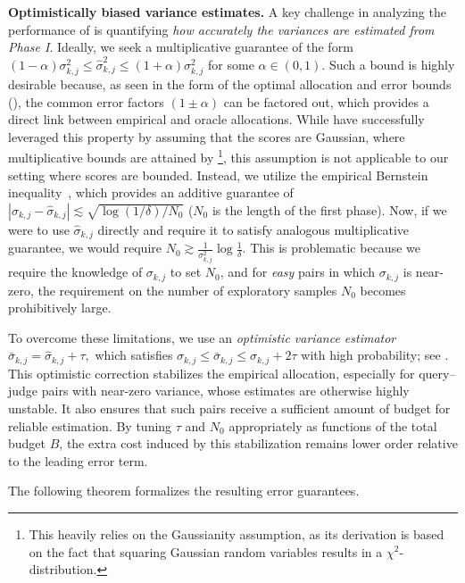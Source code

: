 \documentclass{article}
\theoremstyle{plain}
\theoremstyle{definition}
\theoremstyle{plain}
\begin{document}
{\bf Optimistically biased variance estimates.} A key challenge in analyzing the performance of  is quantifying \emph{how accurately the variances are estimated from Phase I}.
Ideally, we seek a multiplicative guarantee of the form $(1 - \alpha) \sigma_{k,j}^2 \leq \hat{\sigma}_{k,j}^2 \leq (1 + \alpha) \sigma_{k,j}^2$ for some $\alpha \in (0,1)$.
Such a bound is highly desirable because, as seen in the form of the optimal allocation and error bounds (), the common error factors $(1 \pm \alpha)$ can be factored out, which provides a direct link between empirical and oracle allocations. While \citep[Lemma 6]{saha2026budget} have successfully leveraged this property by assuming that the scores are Gaussian, where multiplicative bounds are attained by \citep[Eqn. (4.4) \& (4.5)]{laurent-massart}\footnote{This heavily relies on the Gaussianity assumption, as its derivation is based on the fact that squaring Gaussian random variables results in a $\chi^2$-distribution.}, this assumption is not applicable to our setting where scores are bounded.
Instead, we utilize the empirical Bernstein inequality~\citep[Theorem 10]{maurer-pontil}, which provides an additive guarantee of $| \sigma_{k,j} - \hat{\sigma}_{k,j}| \lesssim \sqrt{\log(1/\delta)/N_0}$ ($N_0$ is the length of the first phase).
Now, if we were to use $\hat{\sigma}_{k,j}$ directly and require it to satisfy analogous multiplicative guarantee, we would require $N_0 \gtrsim \frac{1}{\sigma_{k,j}^2} \log\frac{1}{\delta}$.
This is problematic because we require the knowledge of $\sigma_{k,j}$ to set $N_0$, and for \emph{easy} pairs in which $\sigma_{k,j}$ is near-zero, the requirement on the number of exploratory samples $N_0$ becomes prohibitively large.

To overcome these limitations, we use an \emph{optimistic variance estimator}
\(
\bar{\sigma}_{k,j} = \hat{\sigma}_{k,j} + \tau,
\)
which satisfies \(\sigma_{k,j} \leq \bar{\sigma}_{k,j} \leq \sigma_{k,j} + 2\tau\) with high probability; see . This optimistic correction stabilizes the empirical allocation, especially for query--judge pairs with near-zero variance, whose estimates are otherwise highly unstable. It also ensures that such pairs receive a sufficient amount of budget for reliable estimation. By tuning \(\tau\) and \(N_0\) appropriately as functions of the total budget \(B\), the extra cost induced by this stabilization remains lower order relative to the leading error term.

The following theorem formalizes the resulting error guarantees.
\end{document}
